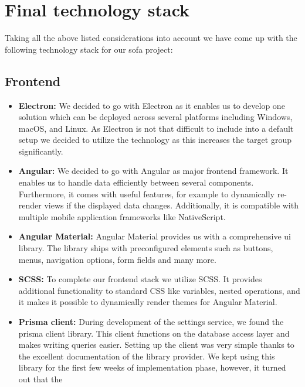 \section{Final technology stack}\label{sec:final-technology-stack}

Taking all the above listed considerations into account we have come up with the following technology stack for our
\ac{sofa} project:

\subsection{Frontend}\label{subsec:frontend}

\begin{itemize}
    \item \textbf{Electron:} We decided to go with Electron as it enables us to develop one solution which can be
        deployed across several platforms including Windows, macOS, and Linux.
        As Electron is not that difficult to include into a default setup we decided to utilize the technology as this
        increases the target group significantly.
    \item \textbf{Angular:} We decided to go with Angular as major frontend framework.
        It enables us to handle data efficiently between several components.
        Furthermore, it comes with useful features, for example to dynamically re-render views if the displayed data
        changes.
        Additionally, it is compatible with multiple mobile application frameworks like NativeScript.
    \item \textbf{Angular Material:} Angular Material provides us with a comprehensive \ac{ui} library.
        The library ships with preconfigured elements such as buttons, menus, navigation options, form fields and many
        more.
    \item \textbf{SCSS:} To complete our frontend stack we utilize SCSS. It provides additional functionality to
        standard CSS like variables, nested operations, and it makes it possible to dynamically render themes for
        Angular Material.
    \item \textbf{Prisma client:} During development of the settings service, we found the prisma client library.
        This client functions on the database access layer and makes writing queries easier.
        Setting up the client was very simple thanks to the excellent documentation of the library provider.
        We kept using this library for the first few weeks of implementation phase, however, it turned out that the

\end{itemize}
